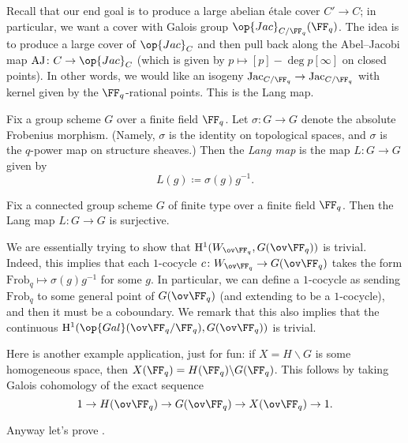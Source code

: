 \documentclass[../notes.tex]{subfiles}
\begin{document}
Recall that our end goal is to produce a large abelian \'etale cover $C'\to C$; in particular, we want a cover with Galois group $\op{Jac}_{C/\FF_q}(\FF_q)$. The idea is to produce a large cover of $\op{Jac}_C$ and then pull back along the Abel--Jacobi map $\mathrm{AJ}\colon C\to\op{Jac}_C$ (which is given by $p\mapsto[p]-\deg p[\infty]$ on closed points). In other words, we would like an isogeny $\mathrm{Jac}_{C/\FF_q}\to\mathrm{Jac}_{C/\FF_q}$ with kernel given by the $\FF_q$-rational points. This is the Lang map.
\begin{definition}
	Fix a group scheme $G$ over a finite field $\FF_q$. Let $\sigma\colon G\to G$ denote the absolute Frobenius morphism. (Namely, $\sigma$ is the identity on topological spaces, and $\sigma$ is the $q$-power map on structure sheaves.) Then the \textit{Lang map} is the map $L\colon G\to G$ given by
	\[L(g)\coloneqq\sigma(g)g^{-1}.\]
\end{definition}
\begin{theorem}[Lang] \label{thm:lang}
	Fix a connected group scheme $G$ of finite type over a finite field $\FF_q$. Then the Lang map $L\colon G\to G$ is surjective.
\end{theorem}
\begin{remark}
	We are essentially trying to show that $\mathrm H^1(W_{\ov\FF_q},G(\ov\FF_q))$ is trivial. Indeed, this implies that each $1$-cocycle $c\colon W_{\ov\FF_q}\to G(\ov\FF_q)$ takes the form $\mathrm{Frob}_q\mapsto\sigma(g)g^{-1}$ for some $g$. In particular, we can define a $1$-cocycle as sending $\mathrm{Frob}_q$ to some general point of $G(\ov\FF_q)$ (and extending to be a $1$-cocycle), and then it must be a coboundary. We remark that this also implies that the continuous $\mathrm H^1(\op{Gal}(\ov\FF_q/\FF_q),G(\ov\FF_q))$ is trivial.
\end{remark}
\begin{remark}
	Here is another example application, just for fun: if $X=H\backslash G$ is some homogeneous space, then $X(\FF_q)=H(\FF_q)\backslash G(\FF_q)$. This follows by taking Galois cohomology of the exact sequence
	\[1\to H(\ov\FF_q)\to G(\ov\FF_q)\to X(\ov\FF_q)\to1.\]
\end{remark}
Anyway let's prove .
\end{document}

